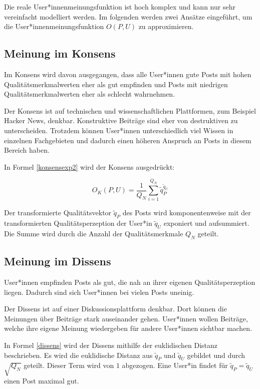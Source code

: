 Die reale User*innenmeinungsfunktion ist hoch komplex und kann nur sehr vereinfacht modelliert werden.
Im folgenden werden zwei Ansätze eingeführt, um die User*innenmeinungsfunktion $O(P,U)$ zu approximieren.
 
\subsection{Meinung im Konsens}

Im Konsens wird davon ausgegangen, dass alle User*innen gute Posts mit hohen Qualitätsmerkmalwerten eher als gut empfinden und Posts mit niedrigen Qualitätsmerkmalwerten eher als schlecht wahrnehmen.

Der Konsens ist auf technischen und wissenschaftlichen Plattformen, zum Beispiel Hacker News, denkbar. Konstruktive Beiträge sind eher von destruktiven zu unterscheiden. Trotzdem können User*innen unterschiedlich viel Wissen in einzelnen Fachgebieten und dadurch einen höheren Anspruch an Posts in diesem Bereich haben.  

In Formel \ref{konsensexp2} wird der Konsens ausgedrückt: 

\begin{equation}
\label{konsensexp2}
O_K(P,U) = \frac{1}{Q_N}\sum_{i = 1}^{Q_N}\tilde{q}_{P}^{\tilde{q}_{U}}
\end{equation}

Der transformierte Qualitätsvektor $\tilde{q}_P$ des Posts wird komponentenweise mit der transformierten Qualitätsperzeption der User*in $\tilde{q}_U$ exponiert und aufsummiert. Die Summe wird durch die Anzahl der Qualitätsmerkmale $Q_N$ geteilt.


\subsection{Meinung im Dissens}

User*innen empfinden Posts als gut, die nah an ihrer eigenen Qualitätsperzeption liegen. Dadurch sind sich User*innen bei vielen Posts uneinig.

Der Dissens ist auf einer Diskussionsplattform denkbar. Dort können die Meinungen über Beiträge stark auseinander gehen. User*innen wollen Beiträge, welche ihre eigene Meinung wiedergeben für andere User*innen sichtbar machen.

In Formel \ref{dissens} wird der Dissens mithilfe der euklidischen Distanz beschrieben. Es wird die euklidische Distanz aus $\tilde{q}_P$ und $\tilde{q}_U$ gebildet und durch $\sqrt{Q_N}$ geteilt. Dieser Term wird von $1$ abgezogen. Eine User*in findet für $\tilde{q}_P = \tilde{q}_U$ einen Post maximal gut.


